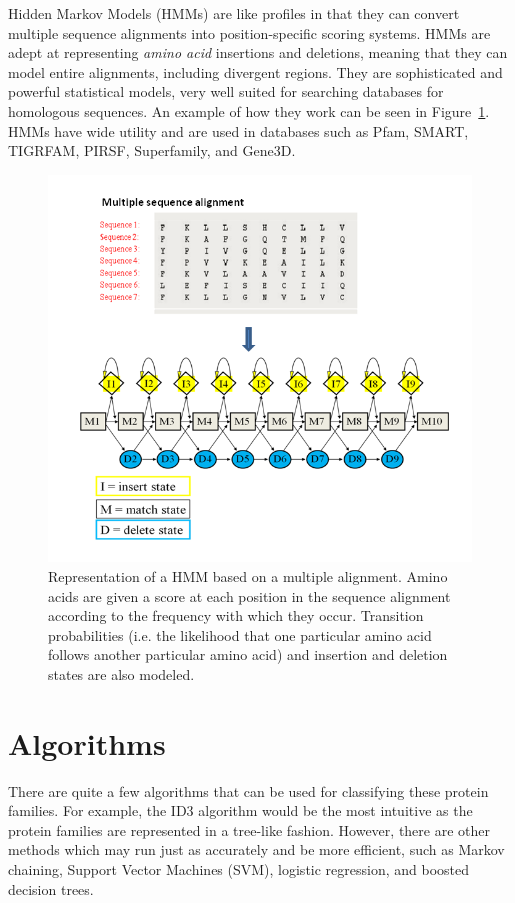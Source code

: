 \documentclass{article}
\begin{document}
Hidden Markov Models (HMMs) are like profiles in that they can convert multiple sequence alignments into position-specific scoring systems. HMMs are adept at representing {\em amino acid} insertions and deletions, meaning that they can model entire alignments, including divergent regions. They are sophisticated and powerful statistical models, very well suited for searching databases for homologous sequences. An example of how they work can be seen in Figure~\ref{fig:HMMs}. HMMs have wide utility and are used in databases such as Pfam, SMART, TIGRFAM, PIRSF, Superfamily, and Gene3D.

\begin{figure}[h!]
\centering
\includegraphics[width=.75\textwidth]{hmms.png}
\caption{Representation of a HMM based on a multiple alignment. Amino acids are given a score at each position in the sequence alignment according to the frequency with which they occur. Transition probabilities (i.e. the likelihood that one particular amino acid follows another particular amino acid) and insertion and deletion states are also modeled. }
\label{fig:HMMs}
\end{figure}



\section*{Algorithms}

There are quite a few algorithms that can be used for classifying these protein families. For example, the ID3 algorithm would be the most intuitive as the protein families are represented in a tree-like fashion. However, there are other methods which may run just as accurately and be more efficient, such as Markov chaining, Support Vector Machines (SVM), logistic regression, and boosted decision trees.
\end{document}
